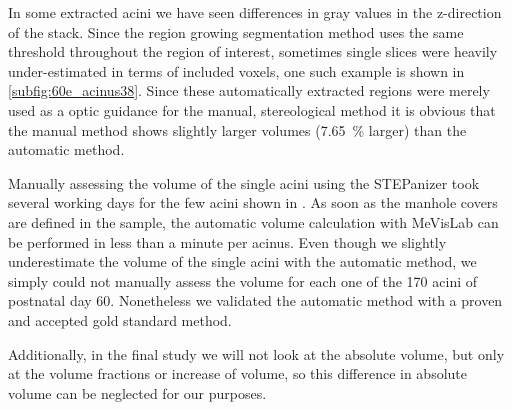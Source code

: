 \documentclass[%
	paper=a4,%
	abstract=true,%
	]{scrartcl}
\begin{document}
In some extracted acini we have seen differences in gray values in the z-direction of the stack. Since the region growing segmentation method uses the same threshold throughout the region of interest, sometimes single slices were heavily under-estimated in terms of included voxels, one such example is shown in \autoref{subfig:60e_acinus38}. Since these automatically extracted regions were merely used as a optic guidance for the manual, stereological method it is obvious that the manual method shows slightly larger volumes (\SI{7.65}{\percent} larger) than the automatic method.

Manually assessing the volume of the single acini using the STEPanizer took several working days for the few acini shown in \label{fig:VolumeMeVisVsSTEPanizer}. As soon as the manhole covers are defined in the sample, the automatic volume calculation with MeVisLab can be performed in less than a minute per acinus. Even though we slightly underestimate the volume of the single acini with the automatic method, we simply could not manually assess the volume for each one of the 170 acini of postnatal day 60. Nonetheless we validated the automatic method with a proven and accepted gold standard method.

Additionally, in the final study we will not look at the absolute volume, but only at the volume fractions or increase of volume, so this difference in absolute volume can be neglected for our purposes.
\end{document}
